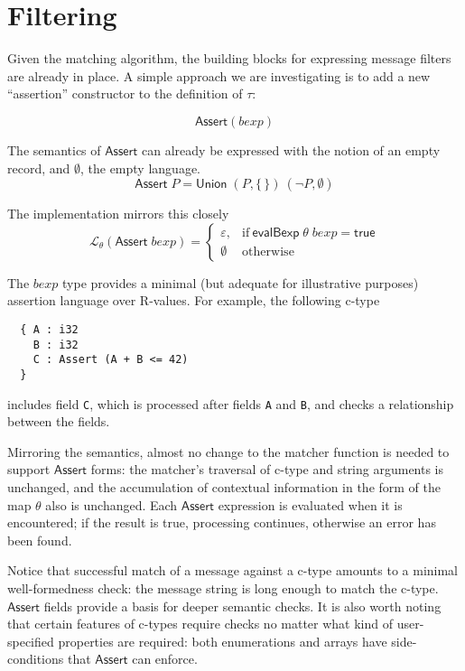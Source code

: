 \documentclass[svgnames]{llncs}
\newcommand{\konst}[1]{\ensuremath{\mathsf{#1}}}
\newcommand{\LangTheta}[1]{\ensuremath{{\mathcal L}_{\theta}({#1})}}
\begin{document}
\section{Filtering}

Given the matching algorithm, the building blocks for expressing
message filters are already in place. A simple approach we are
investigating is to add a new ``assertion'' constructor to the
definition of $\tau$:

\[
  \konst{Assert}(\mathit{bexp})
\]

\noindent The semantics of \konst{Assert} can already be expressed
with the notion of an empty record, and $\emptyset$, the empty
language.
\[\konst{Assert}\; P = \konst{Union} \; (P, \{\,\}) \ (\neg P, \emptyset) \]

\noindent The implementation mirrors this closely
\[
\LangTheta{\konst{Assert}\; \mathit{bexp}} =
 \left\{
    \begin{array}{ll}
    \varepsilon, &  \mathrm{if}\ \konst{evalBexp}\;\theta\;\mathit{bexp} = \konst{true} \\
    \emptyset & \mathrm{otherwise}
 \end{array}
 \right.
\]

The $\mathit{bexp}$ type provides a minimal (but adequate for
illustrative purposes) assertion language over R-values. For example,
the following c-type

\begin{verbatim}
  { A : i32
    B : i32
    C : Assert (A + B <= 42)
  }
\end{verbatim}

\noindent includes field \verb+C+, which is processed after fields
\verb+A+ and \verb+B+, and checks a relationship between the fields.

Mirroring the semantics, almost no change to the matcher function is
needed to support \konst{Assert} forms: the matcher's traversal of
c-type and string arguments is unchanged, and the accumulation of
contextual information in the form of the map $\theta$ also is
unchanged. Each \konst{Assert} expression is evaluated when it is
encountered; if the result is true, processing continues, otherwise
an error has been found.

Notice that successful match of a message against a c-type amounts to
a minimal well-formedness check: the message string is long enough to
match the c-type. \konst{Assert} fields provide a basis for deeper
semantic checks. It is also worth noting that certain features of
c-types require checks no matter what kind of user-specified
properties are required: both enumerations and arrays have
side-conditions that \konst{Assert} can enforce.
\end{document}
